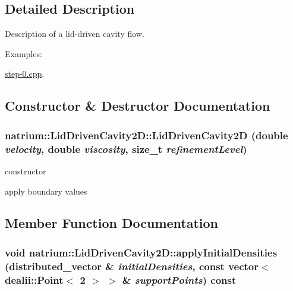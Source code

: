 \subsection{Detailed Description}
Description of a lid-\/driven cavity flow. \begin{Desc}
\item[Examples: ]\par


\hyperlink{step-0_8cpp-example}{step-\/0.cpp}.\end{Desc}


\subsection{Constructor \& Destructor Documentation}
\hypertarget{classnatrium_1_1LidDrivenCavity2D_a139fe700f3e871e1b51eada1a41c69b1}{
\subsubsection[{LidDrivenCavity2D}]{\setlength{\rightskip}{0pt plus 5cm}natrium::LidDrivenCavity2D::LidDrivenCavity2D (double {\em velocity}, \/  double {\em viscosity}, \/  size\_\-t {\em refinementLevel})}}
\label{classnatrium_1_1LidDrivenCavity2D_a139fe700f3e871e1b51eada1a41c69b1}


constructor 

apply boundary values 

\subsection{Member Function Documentation}
\hypertarget{classnatrium_1_1LidDrivenCavity2D_ab4a8629cfd3472847d40cf42a4ca72a8}{
\subsubsection[{applyInitialDensities}]{\setlength{\rightskip}{0pt plus 5cm}void natrium::LidDrivenCavity2D::applyInitialDensities (distributed\_\-vector \& {\em initialDensities}, \/  const vector$<$ dealii::Point$<$ 2 $>$ $>$ \& {\em supportPoints}) const}}
\label{classnatrium_1_1LidDrivenCavity2D_ab4a8629cfd3472847d40cf42a4ca72a8}


